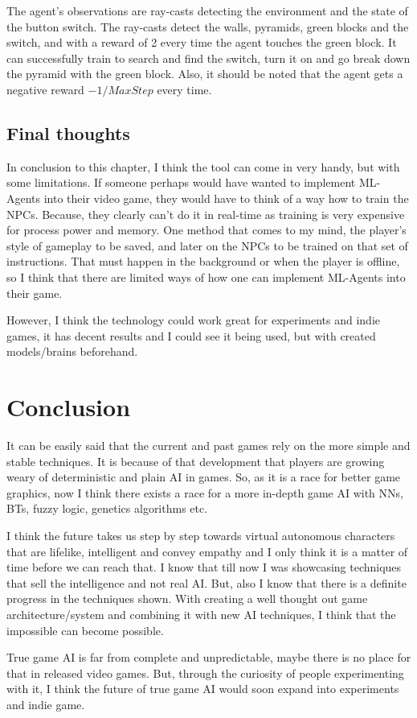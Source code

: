 \documentclass[a4paper, 12pt]{book}
\begin{document}
The agent's observations are ray-casts detecting the environment and the state of the button switch. The ray-casts detect the walls, pyramids, green blocks and the switch, and with a reward of 2 every time the agent touches the green block. It can successfully train to search and find the switch, turn it on and go break down the pyramid with the green block. Also, it should be noted that the agent gets a negative reward $ -1 / MaxStep $ every time.

\section{Final thoughts}

In conclusion to this chapter, I think the tool can come in very handy, but with some limitations. If someone perhaps would have wanted to implement ML-Agents into their video game, they would have to think of a way how to train the NPCs. Because, they clearly can't do it in real-time as training is very expensive for process power and memory. One method that comes to my mind, the player's style of gameplay to be saved, and later on the NPCs to be trained on that set of instructions. That must happen in the background or when the player is offline, so I think that there are limited ways of how one can implement ML-Agents \cite{MLAgents} into their game.

However, I think the technology could work great for experiments and indie games, it has decent results and I could see it being used, but with created models/brains beforehand.

\chapter{Conclusion}
\label{ch4}

It can be easily said that the current and past games rely on the more simple and stable techniques. It is because of that development that players are growing weary of deterministic and plain AI in games. So, as it is a race for better game graphics, now I think there exists a race for a more in-depth game AI with NNs, BTs, fuzzy logic, genetics algorithms etc. 

I think the future takes us step by step towards virtual autonomous characters that are lifelike, intelligent and convey empathy and I only think it is a matter of time before we can reach that. I know that till now I was showcasing techniques that sell the intelligence and not real AI. But, also I know that there is a definite progress in the techniques shown. With creating a well thought out game architecture/system and combining it with new AI techniques, I think that the impossible can become possible.

True game AI is far from complete and unpredictable, maybe there is no place for that in released video games. But, through the curiosity of people experimenting with it, I think the future of true game AI would soon expand into experiments and indie game.

\cleardoublepage
{}


\end{document}
